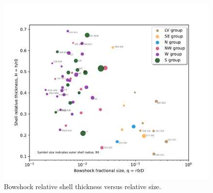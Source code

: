 \documentclass[iop, apj]{emulateapj}
\begin{document}
\begin{figure}
  \centering
  \includegraphics[width=\linewidth]{will-H-vs-q-class}
  \caption{Bowshock relative shell thickness versus relative size.}
  \label{fig:PA-v-PA}
\end{figure}


\end{document}
